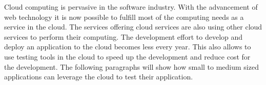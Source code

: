 Cloud computing is pervasive in the software industry.
With the advancement of web technology it is now possible to fulfill most of the computing needs as a service
in the cloud.
The services offering cloud services are also using other cloud services to perform their computing.
The development effort to develop and deploy an application to the cloud becomes less every year.
This also allows to use testing tools in the cloud to speed up the development and reduce cost for the development.
The following paragraphs will show how small to medium sized applications can leverage the cloud to test their application.
